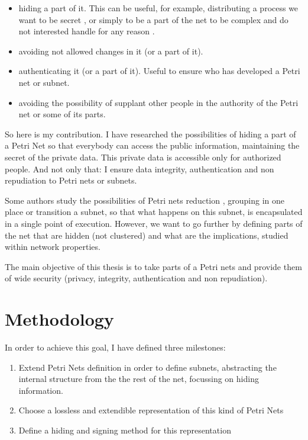 \begin{itemize}
\item 
hiding a part of it. This can be useful, for example,
distributing a process we want to be secret \citep{HID-Inigo2011MT},
or simply to be a part of the net to be complex and do not
interested handle for any reason \citep{HID-Inigo2011MT}.

\item avoiding not allowed changes in it (or a part of it).
\item authenticating it (or a part of it). Useful to ensure who has developed
a Petri net or subnet.
\item avoiding the possibility of supplant other people in the authority of
the Petri net or some of its parts.

\end{itemize}
So here is my contribution. I have researched the possibilities of hiding
a part of a Petri Net so that everybody can access the public information,
maintaining the secret of the private data. This private data is accessible only
for authorized people. And not only that: I ensure data integrity, authentication
and non repudiation to Petri nets or subnets.

Some authors study the possibilities of Petri nets reduction \citep{SN-Valette197935,SN-Suzuki198351,SN-Fahmy1990321,SN-DRUZHININVA19921922,SN-Fahmy1993127,R-Xia20111662}, grouping
in one place or transition a subnet, so that what happens
on this subnet, is encapsulated in a single point of execution. However,
we want to go further by defining parts of the net that are hidden (not clustered) and what are the implications, studied within
network properties.

The main objective of this thesis is to take parts of a Petri nets and provide
them of wide security (privacy, integrity, authentication and non repudiation).



\section{Methodology}


In order to achieve this goal, I have defined three milestones:

\begin{enumerate}
\item
Extend Petri Nets definition in order to define subnets, abstracting the
internal structure from the the rest of the net, focussing on hiding information. 
\item
Choose a lossless and extendible representation
of this kind of Petri Nets
\item
Define a hiding and signing method for this representation
\end{enumerate}




